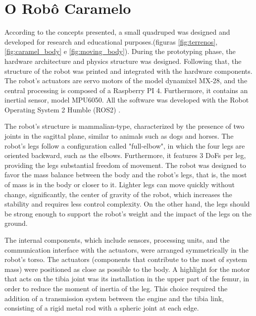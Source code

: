 \documentclass[conference]{IEEEtran}
\begin{document}
\section{O Robô Caramelo}

According to the concepts presented, a small quadruped was designed and developed for research and educational purposes.(figuras \ref{fig:terrenos}, \ref{fig:caramel_body} e \ref{fig:moving_body}).
During the prototyping phase, the hardware architecture and physics structure was designed. Following that, the structure of the robot was printed and integrated with the hardware components. The robot's actuators are servo motors of the model dynamixel MX-28, and the central processing is composed of a Raspberry PI 4. Furthermore, it contains an inertial sensor, model MPU6050. All the software was developed with the Robot Operating System 2 Humble (ROS2) \cite{ROS2Humble}.

The robot's structure is mammalian-type, characterized by the presence of two joints in the sagittal plane, similar to animals such as dogs and horses.  The robot’s legs follow a configuration called "full-elbow", in which the four legs are oriented backward, such as the elbows. Furthermore, it features 3 DoFs per leg, providing the legs substantial freedom of movement. The robot was designed to favor the mass balance between the body and the robot's legs, that is, the most of mass is in the body or closer to it. Lighter legs can move quickly without change, significantly, the center of gravity of the robot, which increases the stability and requires less control complexity.  On the other hand, the legs should be strong enough to support the robot's weight and the impact of the legs on the ground. 

The internal components, which include sensors, processing units, and the communication interface with the actuators, were arranged symmetrically in the robot's torso. The actuators (components that contribute to the most of system mass) were positioned as close as possible to the body. A highlight for the motor that acts on the tibia joint was its installation in the upper part of the femur, in order to reduce the moment of inertia of the leg. This choice required the addition of a transmission system between the engine and the tibia link, consisting of a rigid metal rod with a spheric joint at each edge.
\end{document}
